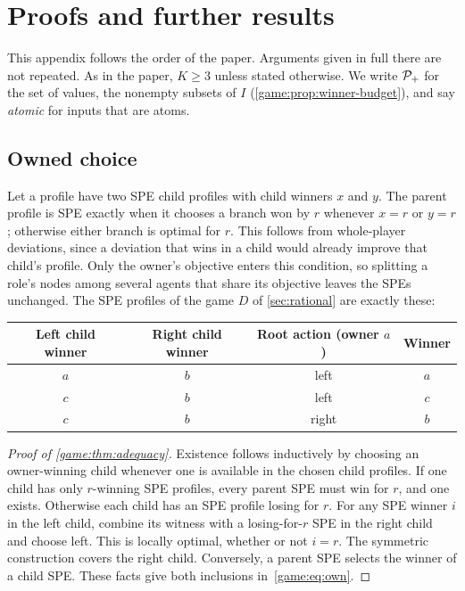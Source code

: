 \section{Proofs and further results}\label{app:proofs}

This appendix follows the order of the paper. Arguments given in full there are not repeated. As in the paper, $K\geq3$ unless stated otherwise. We write $\mathcal P_+$ for the set of values, the nonempty subsets of $I$ (\cref{game:prop:winner-budget}), and say \emph{atomic} for inputs that are atoms.

\subsection{Owned choice}\label{app:proofs-rational}

Let a profile have two SPE child profiles with child winners $x$ and $y$. The parent profile is SPE exactly when it chooses a branch won by $r$ whenever $x=r$ or $y=r$; otherwise either branch is optimal for $r$. This follows from
whole-player deviations, since a deviation that wins in a child would already improve that child's profile. Only the owner's objective enters this condition, so splitting a role's nodes among several agents that share its objective leaves the SPEs unchanged. The SPE profiles of the game $D$ of \cref{sec:rational} are exactly these:
\begin{center}
\begin{tabular}{cccc}
\toprule
Left child winner & Right child winner & Root action (owner $a$) & Winner\\
\midrule
$a$ & $b$ & left & $a$\\
$c$ & $b$ & left & $c$\\
$c$ & $b$ & right & $b$\\
\bottomrule
\end{tabular}
\end{center}

\begin{proof}[Proof of \cref{game:thm:adequacy}]
Existence follows inductively by choosing an owner-winning child whenever
one is available in the chosen child profiles. If one child has only
$r$-winning SPE profiles, every parent SPE must win for $r$, and one
exists. Otherwise each child has an SPE profile losing for $r$. For any
SPE winner $i$ in the left child, combine its witness with a losing-for-$r$
SPE in the right child and choose left. This is locally optimal, whether
or not $i=r$. The symmetric construction covers the right child.
Conversely, a parent SPE selects the winner of a child SPE. These facts
give both inclusions in~\eqref{game:eq:own}.
\end{proof}

